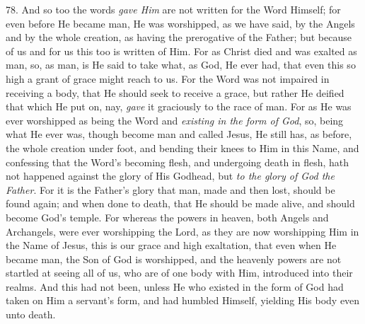 78. And so too the words \emph{gave
Him} are not written for the Word Himself; for even before He
became man, He was worshipped, as we have said, by the Angels and by
the whole creation, as having the prerogative of the Father; but
because of us and for us this too is written of Him. For as Christ
died and was exalted as man, so, as man, is He said to take what, as
God, He ever had, that even this so high a grant of grace might reach
to us. For the Word was not impaired in receiving a body, that He
should seek to receive a grace, but rather He deified that which He
put on, nay, \emph{gave} it graciously to the race of man. For as He
was ever worshipped as being the Word and \emph{existing in the form of
God}, so, being what He ever was, though become man and called
Jesus, He still has, as before, the whole creation under foot, and
bending their knees to Him in this Name, and confessing that the Word's
becoming flesh, and undergoing death in flesh, hath not happened
against the glory of His Godhead, but \emph{to the glory of God the
Father}. For it is the Father's glory that man, made and then lost,
should be found again; and when done to death, that He should be made
alive, and should become God's temple. For whereas the powers in
heaven, both Angels and Archangels, were ever worshipping the Lord, as
they are now worshipping Him in the Name of Jesus, this is our grace
and high exaltation, that even when He became man, the Son of God is
worshipped, and the heavenly powers are not startled at seeing
all of us, who are of one body with Him, introduced into their realms.
And this had not been, unless He who existed in the form of God had
taken on Him a servant's form, and had humbled Himself, yielding His
body even unto death.


